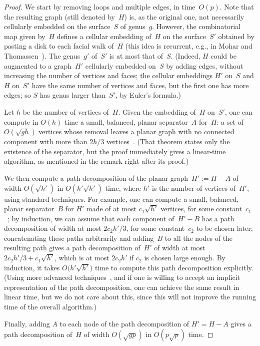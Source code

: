 \documentclass[11pt]{article}
\theoremstyle{plain}  \newtheorem{theorem}{Theorem}[section]
\theoremstyle{definition}
\begin{document}
\begin{proof}
  We start by removing loops and multiple edges, in time~$O(p)$.  Note that
  the resulting graph (still denoted by~$H$) is, as the original one, not
  necessarily cellularly embedded on the surface~$S$ of genus~$g$.
  However, the combinatorial map given by~$H$ defines a cellular embedding
  of~$H$ on the surface~$S'$ obtained by pasting a disk to each facial
  walk of~$H$ (this idea is recurrent, e.g., in Mohar and
  Thomassen~\cite{mt-gs-01}).  The genus~$g'$ of~$S'$ is at most that
  of~$S$.  (Indeed, $H$ could be augmented to a graph~$H'$ cellularly
  embedded on~$S$ by adding edges, without increasing the number of
  vertices and faces; the cellular embeddings $H'$ on~$S$ and $H$ on~$S'$
  have the same number of vertices and faces, but the first one has more
  edges; so $S$ has genus larger than~$S'$, by Euler's formula.)

  Let $h$ be the number of vertices of~$H$.  Given the embedding of~$H$
  on~$S'$, one can compute in $O(h)$ time a small, balanced, planar
  separator~$A$ for~$H$: a set of $O(\sqrt{gh})$ vertices whose removal
  leaves a planar graph with no connected component with more than $2h/3$
  vertices~\cite[Theorem~5.1]{e-dgteg-03}.  (That theorem states only the
  existence of the separator, but the proof immediately gives a linear-time
  algorithm, as mentioned in the remark right after its proof.)

  We then compute a path decomposition of the planar graph~$H':=H-A$ of
  width $O(\sqrt{h'})$ in $O(h'\sqrt{h'})$ time, where $h'$ is the number
  of vertices of~$H'$, using standard techniques.  For example, one can
  compute a small, balanced, planar separator~$B$ for $H'$ made of at most
  $c_1\sqrt{h'}$ vertices, for some constant~$c_1$~\cite{lt-stpg-79}; by
  induction, we can assume that each component of~$H'-B$ has a path
  decomposition of width at most $2c_2h'/3$, for some constant~$c_2$ to be
  chosen later; concatenating these paths arbitrarily and adding~$B$ to all
  the nodes of the resulting path gives a path decomposition of~$H'$ of
  width at most $2c_2h'/3+c_1\sqrt{h'}$, which is at most $2c_2h'$ if $c_2$
  is chosen large enough.  By induction, it takes $O\big(h'\sqrt{h'}\big)$
  time to compute this path decomposition explicitly.  (Using more advanced
  techniques~\cite{g-psppt-95}, and if one is willing to accept an implicit
  representation of the path decomposition, one can achieve the same result
  in linear time, but we do not care about this, since this will not
  improve the running time of the overall algorithm.)

  Finally, adding $A$ to each node of the path decomposition of $H'=H-A$
  gives a path decomposition of~$H$ of width $O(\sqrt{gp})$ in $O(p\sqrt
  p)$ time.
\end{proof}
\end{document}

